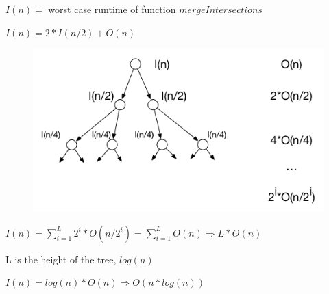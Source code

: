 $I(n) =$ worst case runtime of function $mergeIntersections$

$I(n) = 2 * I(n/2) + O(n)$

\begin{figure}[H]
    \centering
    \includegraphics[scale=0.4]{1b-runtime}
\end{figure}

$I(n) = \sum_{i=1}^{L} 2^i * O(n/2^i) = \sum_{i=1}^{L} O(n) \Rightarrow L * O(n)$

L is the height of the tree, $log(n)$

$I(n) = log(n) * O(n) \Rightarrow O(n*log(n))$

